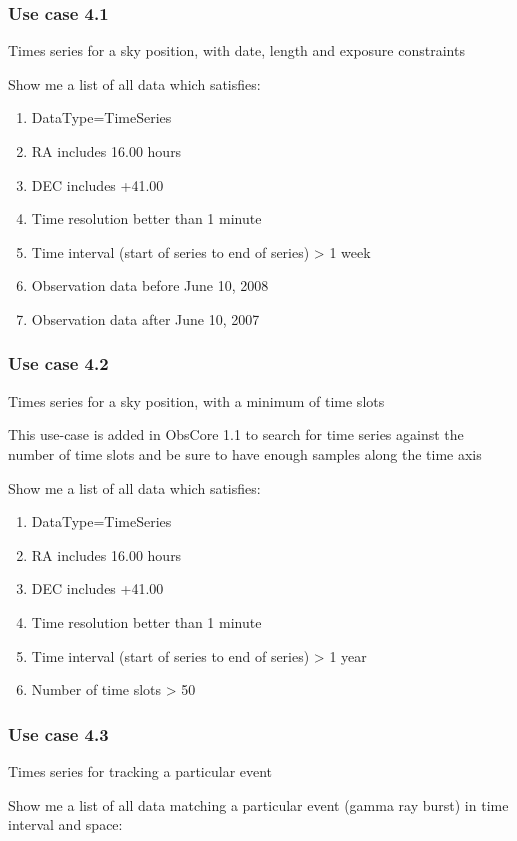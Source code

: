 \documentclass[11pt,a4paper]{ivoa}
\begin{document}
\subsubsection[Use case 4.1]{Use case 4.1}
Times series for a sky position, with date, length and exposure constraints  

Show me a list of all data which satisfies:

\begin{enumerate}
\item DataType=TimeSeries
\item RA includes 16.00 hours
\item DEC includes +41.00
\item Time resolution better than 1 minute
\item Time interval (start of series to end of series) {\textgreater} 1 week
\item Observation data before June 10, 2008
\item Observation data after June 10, 2007
\end{enumerate}
\subsubsection{Use case 4.2}
Times series for a sky position, with a minimum of time slots

This use-case is added in ObsCore 1.1 to search for time series against the number of time slots and be sure to have
enough samples along the time axis

Show me a list of all data which satisfies:

\begin{enumerate}
\item DataType=TimeSeries
\item RA includes 16.00 hours
\item DEC includes +41.00
\item Time resolution better than 1 minute
\item Time interval (start of series to end of series) {\textgreater} 1 year
\item Number of time slots {\textgreater} 50
\end{enumerate}
\subsubsection{Use case 4.3}
Times series for tracking a particular event 

Show me a list of all data matching a particular event (gamma ray burst) in time interval and space:
\end{document}
